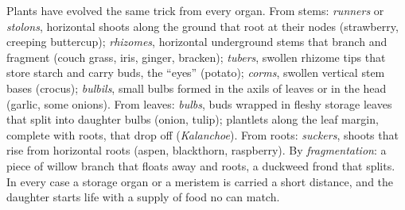 \begin{proposition}\label{prop:b2:asexual-reproduction:organs}
Plants have evolved the same trick from every organ. From stems:
\emph{runners} or \emph{stolons}, horizontal shoots along the ground
that root at their nodes (strawberry, creeping buttercup);
\emph{rhizomes}, horizontal underground stems that branch and
fragment (couch grass, iris, ginger, bracken); \emph{tubers}, swollen
rhizome tips that store starch and carry buds, the ``eyes''
(potato); \emph{corms}, swollen vertical stem bases (crocus);
\emph{bulbils}, small bulbs formed in the axils of leaves or in the
 head (garlic, some onions). From leaves: \emph{bulbs}, buds
wrapped in fleshy storage leaves that split into daughter bulbs
(onion, tulip); plantlets along the leaf margin, complete with roots,
that drop off (\emph{Kalanchoe}). From roots: \emph{suckers}, shoots
that rise from horizontal roots (aspen, blackthorn, raspberry). By
\emph{fragmentation}: a piece of willow branch that floats away and
roots, a duckweed frond that splits. In every case a storage organ
or a meristem is carried a short distance, and the daughter starts
life with a supply of food no  can match.
\end{proposition}

